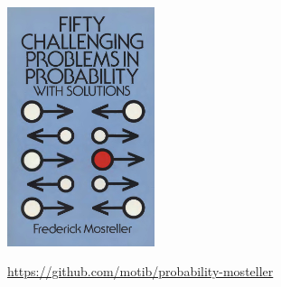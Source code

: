 \documentclass{beamer}
\begin{document}
\begin{frame}

\begin{center}
\vspace*{-5ex}
\includegraphics[height=7cm]{mosteller-cover}
\end{center}

\medskip

\small\url{https://github.com/motib/probability-mosteller}

\end{frame}
\end{document}
